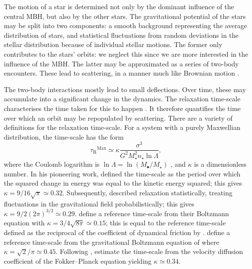 \documentclass[useAMS,usedcolumn,usegraphicx,usenatbib]{mn2e}
\newcommand{\sub}[1]{\ensuremath{_\mathrm{#1}}}
\newcommand{\super}[1]{\ensuremath{^\mathrm{#1}}}
\begin{document}
The motion of a star is determined not only by the dominant influence of the central MBH, but also by the other stars. The gravitational potential of the stars may be split into two components: a smooth background representing the average distribution of stars, and statistical fluctuations from random deviations in the stellar distribution because of individual stellar motions. The former only contributes to the stars' orbits: we neglect this since we are more interested in the influence of the MBH. The latter may be approximated as a series of two-body encounters. These lead to scattering, in a manner much like Brownian motion \citep{Bekenstein1992,Maoz1993,Nelson1999}.

The two-body interactions mostly lead to small deflections. Over time, these may accumulate into a significant change in the dynamics. The relaxation time-scale characterises the time taken for this to happen \citep[section 1.2.1]{Binney2008}. It therefore quantifies the time over which an orbit may be repopulated by scattering. There are a variety of definitions for the relaxation time-scale. For a system with a purely Maxwellian distribution, the time-scale has the form
\begin{equation}
\tau\sub{R}\super{Max} \simeq \kappa\frac{\sigma^3}{G^2M_\star^2 n_\star\ln\Lambda},
\label{eq:tauMaxwell}
\end{equation}
where the Coulomb logarithm is $\ln\Lambda = \ln(M_\bullet/M_\star)$ \citep{Bahcall1976}, and $\kappa$ is a dimensionless number. In his pioneering work, \citet{Chandrasekhar1941, Chandrasekhar1960} defined the time-scale as the period over which the squared change in energy was equal to the kinetic energy squared; this gives $\kappa = 9/16\sqrt{\pi} \simeq 0.32$. Subsequently, \citet{Chandrasekhar1941a} described relaxation statistically, treating fluctuations in the gravitational field probabilistically; this gives $\kappa = 9/2(2\pi)^{3/2} \simeq 0.29$. \citet{Bahcall1977} define a reference time-scale from their Boltzmann equation with $\kappa = 3/4\sqrt{8\pi} \simeq 0.15$; this is equal to the reference time-scale defined as the reciprocal of the coefficient of dynamical friction by \citet{Chandrasekhar1943a, Chandrasekhar1943}. \citet{Spitzer1958} define a reference time-scale from the gravitational Boltzmann equation of \citet{Spitzer1951} where $\kappa = \sqrt{2}/\pi \simeq 0.45$. Following \citet{Spitzer1971}, \citet[section 7.4.5]{Binney2008} estimate the time-scale from the velocity diffusion coefficient of the Fokker--Planck equation yielding $\kappa \simeq 0.34$.
\end{document}
